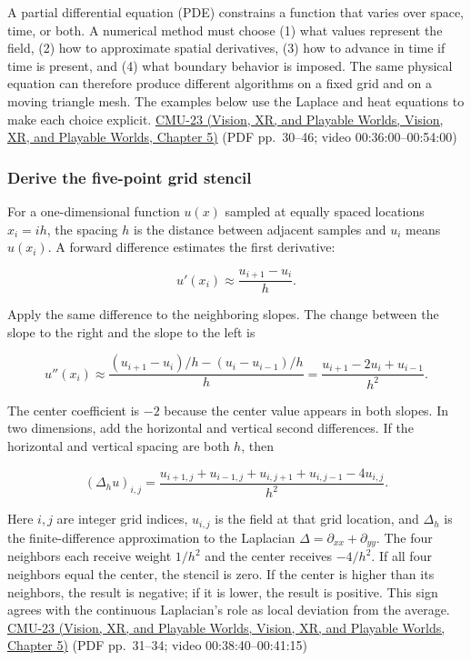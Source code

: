 A partial differential equation (PDE) constrains a function that varies over space, time, or both. A numerical method must choose (1) what values represent the field, (2) how to approximate spatial derivatives, (3) how to advance in time if time is present, and (4) what boundary behavior is imposed. The same physical equation can therefore produce different algorithms on a fixed grid and on a moving triangle mesh. The examples below use the Laplace and heat equations to make each choice explicit. \href{../07-Vision-XR-and-Playable-Worlds/main.pdf\#nameddest=04-visual-computing-ii-ch036-cmu-23---physically-based-animation-and-pdes}{CMU-23 (Vision, XR, and Playable Worlds, Vision, XR, and Playable Worlds, Chapter 5)} (PDF pp.~30--46; video 00:36:00--00:54:00)

\subsubsection{Derive the five-point grid stencil}\label{04-visual-computing-ii-ch030-derive-the-five-point-grid-stencil}

For a one-dimensional function \(u(x)\) sampled at equally spaced locations \(x_i=ih\), the spacing \(h\) is the distance between adjacent samples and \(u_i\) means \(u(x_i)\). A forward difference estimates the first derivative:

\[
u'(x_i)\approx\frac{u_{i+1}-u_i}{h}.
\]

Apply the same difference to the neighboring slopes. The change between the slope to the right and the slope to the left is

\[
u''(x_i)\approx\frac{(u_{i+1}-u_i)/h-(u_i-u_{i-1})/h}{h}
=\frac{u_{i+1}-2u_i+u_{i-1}}{h^2}.
\]

The center coefficient is \(-2\) because the center value appears in both slopes. In two dimensions, add the horizontal and vertical second differences. If the horizontal and vertical spacing are both \(h\), then

\[
(\Delta_h u)_{i,j}=\frac{u_{i+1,j}+u_{i-1,j}+u_{i,j+1}+u_{i,j-1}-4u_{i,j}}{h^2}.
\]

Here \(i,j\) are integer grid indices, \(u_{i,j}\) is the field at that grid location, and \(\Delta_h\) is the finite-difference approximation to the Laplacian \(\Delta=\partial_{xx}+\partial_{yy}\). The four neighbors each receive weight \(1/h^2\) and the center receives \(-4/h^2\). If all four neighbors equal the center, the stencil is zero. If the center is higher than its neighbors, the result is negative; if it is lower, the result is positive. This sign agrees with the continuous Laplacian's role as local deviation from the average. \href{../07-Vision-XR-and-Playable-Worlds/main.pdf\#nameddest=04-visual-computing-ii-ch036-cmu-23---physically-based-animation-and-pdes}{CMU-23 (Vision, XR, and Playable Worlds, Vision, XR, and Playable Worlds, Chapter 5)} (PDF pp.~31--34; video 00:38:40--00:41:15)

